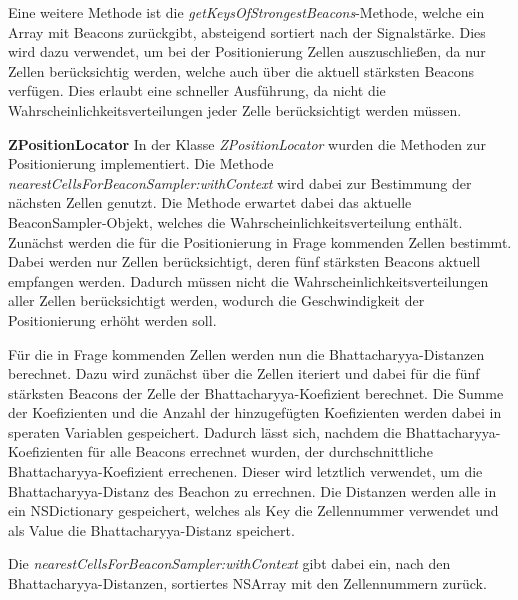 Eine weitere Methode ist die \emph{getKeysOfStrongestBeacons}-Methode, welche ein Array mit Beacons zurückgibt, absteigend sortiert nach der Signalstärke. Dies wird dazu verwendet, um bei der Positionierung Zellen auszuschließen, da nur Zellen berücksichtig werden, welche auch über die aktuell stärksten Beacons verfügen. Dies erlaubt eine schneller Ausführung, da nicht die Wahrscheinlichkeitsverteilungen jeder Zelle berücksichtigt werden müssen.



\textbf{ZPositionLocator}
In der Klasse \emph{ZPositionLocator} wurden die Methoden zur Positionierung implementiert. Die Methode \emph{nearestCellsForBeaconSampler:withContext} wird dabei zur Bestimmung der nächsten Zellen genutzt. 
Die Methode erwartet dabei das aktuelle BeaconSampler-Objekt, welches die Wahrscheinlichkeitsverteilung enthält. 
Zunächst werden die für die Positionierung in Frage kommenden Zellen bestimmt. Dabei werden nur Zellen berücksichtigt, deren fünf stärksten Beacons aktuell empfangen werden. Dadurch müssen nicht die Wahrscheinlichkeitsverteilungen aller Zellen berücksichtigt werden, wodurch die Geschwindigkeit der Positionierung erhöht werden soll.

Für die in Frage kommenden Zellen werden nun die Bhattacharyya-Distanzen berechnet. Dazu wird zunächst über die Zellen iteriert und dabei für die fünf stärksten Beacons der Zelle der Bhattacharyya-Koefizient berechnet. Die Summe der Koefizienten und die Anzahl der hinzugefügten Koefizienten werden dabei in  speraten Variablen gespeichert. Dadurch lässt sich, nachdem die Bhattacharyya-Koefizienten für alle Beacons errechnet wurden, der durchschnittliche Bhattacharyya-Koefizient errechenen. Dieser wird letztlich verwendet, um die Bhattacharyya-Distanz des Beachon zu errechnen. Die Distanzen werden alle in ein NSDictionary gespeichert, welches als Key die Zellennummer verwendet und als Value die Bhattacharyya-Distanz speichert.

Die \emph{nearestCellsForBeaconSampler:withContext} gibt dabei ein, nach den Bhattacharyya-Distanzen, sortiertes NSArray mit den Zellennummern zurück. 




